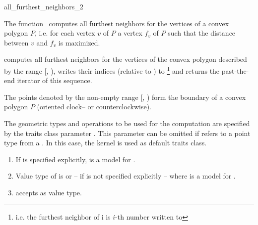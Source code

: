 
\cgalColumnLayout

\begin{ccRefFunction}{all_furthest_neighbors_2}
  
  \ccDefinition The function \ccRefName\ computes all furthest
  neighbors for the vertices of a convex polygon $P$, i.e. for each
  vertex $v$ of $P$ a vertex $f_v$ of $P$ such that the distance
  between $v$ and $f_v$ is maximized.


  \def\ccLongParamLayout{\ccTrue} 
  
  
  computes all furthest neighbors for the vertices of the convex
  polygon described by the range [,
  ), writes their indices (relative to
  ) to \footnote{i.e. the furthest neighbor
    of \ccc{points_begin[}i\ccc{]} is \ccc{points_begin[}$i$-th number
    written to \ccc{]}} and returns the past-the-end iterator
  of this sequence.
  
  \ccPrecond The points denoted by the non-empty range
  [, ) form the boundary of a convex
  polygon $P$ (oriented clock-- or counterclockwise).
  
  The geometric types and operations to be used for the computation
  are specified by the traits class parameter . This parameter
  can be omitted if  refers to a point type
  from a . In this case, the kernel is used as default
  traits class.
  
  \ccRequire
  \begin{enumerate}
  \item If  is specified explicitly,  is a model
    for .
  \item Value type of  is
     or -- if  is not specified explicitly
    --  where  is a model for .
  \item {} accepts  as value type.
  \end{enumerate}
  

\end{ccRefFunction}

